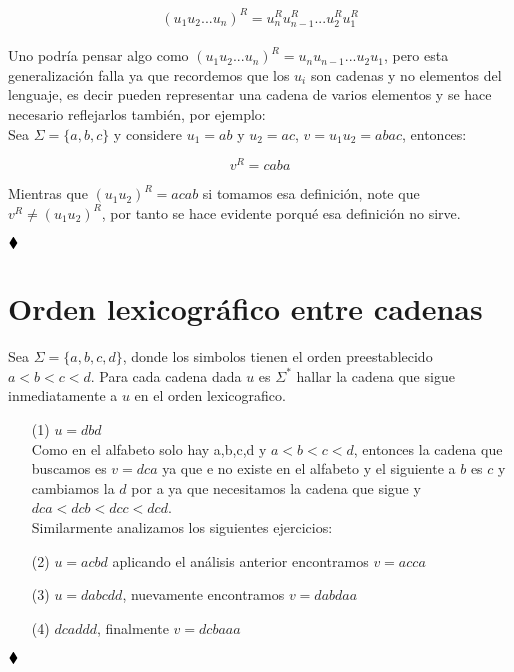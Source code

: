 $$(u_1u_2...u_n)^R=u_n^Ru_{n-1}^R...u_2^Ru_1^R$$\\

Uno podría pensar algo como $(u_1u_2...u_n)^R=u_nu_{n-1}...u_2u_1$, pero esta generalización falla ya que recordemos que los $u_i$ son cadenas y no elementos del lenguaje, es decir pueden representar una cadena de varios elementos y se hace necesario reflejarlos también, por ejemplo:\\

Sea $\Sigma=\{a,b,c\}$ y considere $u_1=ab$ y $u_2=ac$, $v=u_1u_2=abac$, entonces:

$$v^R=caba$$

Mientras que $(u_1u_2)^R=acab$ si tomamos esa definición, note que $v^R\neq (u_1u_2)^R$, por tanto se hace evidente porqué esa definición no sirve.

$\hfill \blacklozenge$

\section{Orden lexicográfico entre cadenas}

Sea $\Sigma=\{a,b,c,d\}$, donde los simbolos tienen el orden preestablecido $a<b<c<d.$ Para cada cadena dada $u$ es $\Sigma^*$ hallar la cadena que sigue inmediatamente a $u$ en el orden lexicografico.

\begin{itemize}
\item[(1)] $u=d b d$\\

Como en el alfabeto solo hay a,b,c,d y $a<b<c<d$, entonces la cadena que buscamos es $v=dca$ ya que e no existe en el alfabeto y el siguiente a $b$ es $c$ y cambiamos la $d$ por a ya que necesitamos la cadena que sigue y $dca<dcb<dcc<dcd$.\\

Similarmente analizamos los siguientes ejercicios:\\

\item[(2)] $u=acbd$ aplicando el análisis anterior encontramos $v=acca$\\

\item[(3)] $u=dabcdd$, nuevamente encontramos $v=dabdaa$\\

\item[(4)] $dcaddd$, finalmente $v=dcbaaa$
\end{itemize}
$\hfill \blacklozenge$

